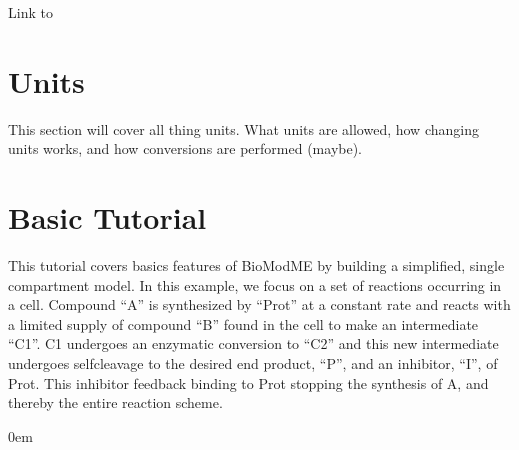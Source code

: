 \documentclass[letterpaper,10pt,english]{sphinxmanual}
\begin{document}
\sphinxAtStartPar
Link to {\hyperref[\detokenize{pages/tutorial_par_estimation::doc}]{}}


\chapter{Units}
\label{\detokenize{pages/backend/units:units}}\label{\detokenize{pages/backend/units::doc}}
\sphinxAtStartPar
This section will cover all thing units.  What units are allowed, how changing
units works, and how conversions are performed (maybe).


\chapter{Basic Tutorial}
\label{\detokenize{pages/tutorial_sc_index:basic-tutorial}}\label{\detokenize{pages/tutorial_sc_index::doc}}
\sphinxAtStartPar
This tutorial covers basics features of BioModME by building a simplified,
single compartment model. In this example, we focus on a set of reactions
occurring in a cell. Compound “A” is synthesized by “Prot” at a constant rate
and reacts with a limited supply of compound “B” found in the cell to make an
intermediate “C1”. C1 undergoes an enzymatic conversion to “C2” and this new
intermediate undergoes self\sphinxhyphen{}cleavage to the desired end product, “P”, and an
inhibitor, “I”, of Prot.  This inhibitor feedback binding to Prot stopping the
synthesis of A, and thereby the entire reaction scheme.

\begin{figure}[htbp]
\centering

\noindent{}
\end{figure}

\begin{DUlineblock}{0em}
\item[] 
\end{DUlineblock}
\end{document}
